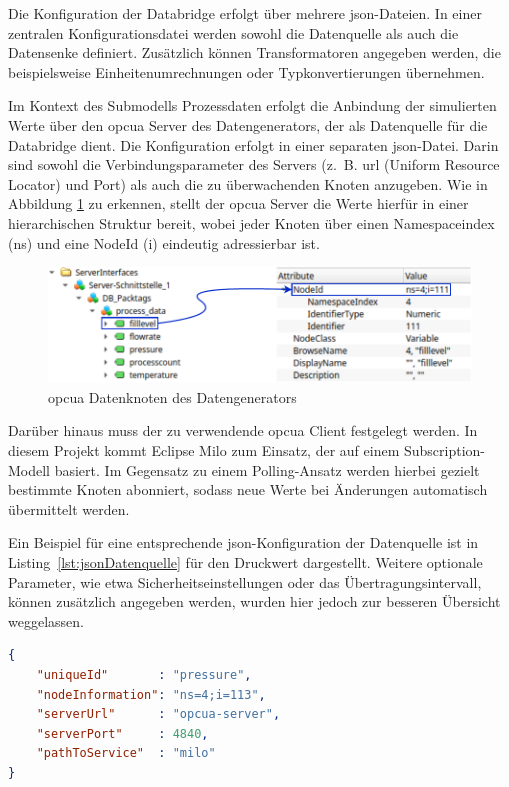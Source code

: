 Die Konfiguration der Databridge erfolgt über mehrere \acs{json}-Dateien.
In einer zentralen Konfigurationsdatei werden sowohl die Datenquelle als auch die Datensenke definiert.
Zusätzlich können Transformatoren angegeben werden, die beispielsweise Einheitenumrechnungen oder Typkonvertierungen übernehmen.

Im Kontext des Submodells Prozessdaten erfolgt die Anbindung der simulierten Werte über den \acs{opcua} Server des Datengenerators, der als Datenquelle für die Databridge dient.
Die Konfiguration erfolgt in einer separaten \acs{json}-Datei.
Darin sind sowohl die Verbindungsparameter des Servers (z.~B. \acs{url} (Uniform Resource Locator) und Port) als auch die zu überwachenden Knoten anzugeben.
Wie in Abbildung \ref{fig:OPCUADatenStruktur} zu erkennen, stellt der \acs{opcua} Server die Werte hierfür in einer hierarchischen Struktur bereit, wobei jeder Knoten über einen Namespaceindex (ns) und eine NodeId (i) eindeutig adressierbar ist.

\newpage
\begin{figure}[htbp]
    \centering
    \includegraphics{Bilder/OPCUA/OPCUADaten.pdf}
    \caption[\acs{opcua} Datenknoten des Datengenerators]{\acs{opcua} Datenknoten des Datengenerators}
    \label{fig:OPCUADatenStruktur}
\end{figure}

Darüber hinaus muss der zu verwendende \acs{opcua} Client festgelegt werden.
In diesem Projekt kommt Eclipse Milo zum Einsatz, der auf einem Subscription-Modell basiert.
Im Gegensatz zu einem Polling-Ansatz werden hierbei gezielt bestimmte Knoten abonniert, sodass neue Werte bei Änderungen automatisch übermittelt werden.

Ein Beispiel für eine entsprechende \acs{json}-Konfiguration der Datenquelle ist in Listing~\ref{lst:jsonDatenquelle} für den Druckwert dargestellt.
Weitere optionale Parameter, wie etwa Sicherheitseinstellungen oder das Übertragungsintervall, können zusätzlich angegeben werden, wurden hier jedoch zur besseren Übersicht weggelassen.

\begin{lstlisting}[language=json, caption={\acs{json}-Konfiguration einer Datenquelle}, label={lst:jsonDatenquelle}]
{
    "uniqueId"       : "pressure",
    "nodeInformation": "ns=4;i=113",
    "serverUrl"      : "opcua-server",
    "serverPort"     : 4840,
    "pathToService"  : "milo"
}
\end{lstlisting}

